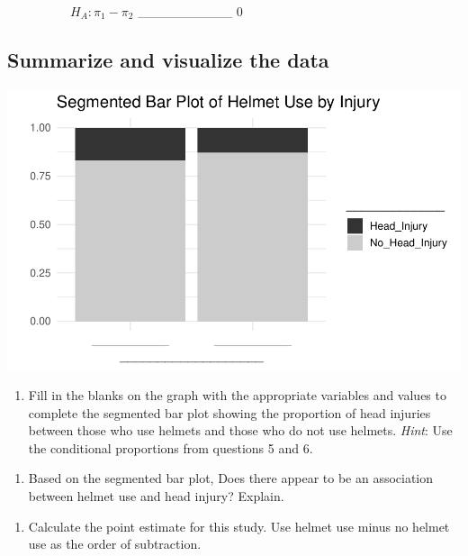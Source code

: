 \documentclass[
]{report}
\providecommand{\tightlist}{%
  \setlength{\itemsep}{0pt}\setlength{\parskip}{0pt}}
\begin{document}
~~~~~~~~~~\(H_A: \pi_1 -\pi_2\) \_\_\_\_\_\_\_\_\_\_ 0

\newpage

\hypertarget{summarize-and-visualize-the-data}{%
\subsection*{Summarize and visualize the data}\label{summarize-and-visualize-the-data}}

\begin{center}\includegraphics[width=0.7\linewidth]{07-inference-2cat_files/figure-latex/unnamed-chunk-2-1} \end{center}

\begin{enumerate}
\def\labelenumi{\arabic{enumi}.}
\setcounter{enumi}{10}
\tightlist
\item
  Fill in the blanks on the graph with the appropriate variables and values to complete the segmented bar plot showing the proportion of head injuries between those who use helmets and those who do not use helmets. \emph{Hint}: Use the conditional proportions from questions 5 and 6.
\end{enumerate}

\vspace{0.1in}

\begin{enumerate}
\def\labelenumi{\arabic{enumi}.}
\setcounter{enumi}{11}
\tightlist
\item
  Based on the segmented bar plot, Does there appear to be an association between helmet use and head injury? Explain.
\end{enumerate}

\vspace{1in}

\begin{enumerate}
\def\labelenumi{\arabic{enumi}.}
\setcounter{enumi}{12}
\tightlist
\item
  Calculate the point estimate for this study. Use helmet use minus no helmet use as the order of subtraction.
\end{enumerate}
\end{document}
